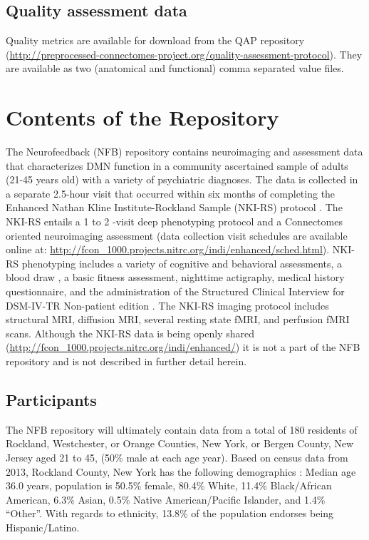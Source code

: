 \subsection{Quality assessment data}
Quality metrics are available for download from the QAP repository (\url{http://preprocessed-connectomes-project.org/quality-assessment-protocol}). They are available as two (anatomical and functional) comma separated value files.

\section{Contents of the Repository}
The Neurofeedback (NFB) repository contains neuroimaging and assessment data that characterizes DMN function in a community ascertained sample of adults (21-45 years old) with a variety of psychiatric diagnoses. The data is collected in a separate 2.5-hour visit that occurred within six months of completing the Enhanced Nathan Kline Institute-Rockland Sample (NKI-RS) protocol \cite{Nooner2012}. The NKI-RS entails a 1 to 2 -visit deep phenotyping protocol \cite{Nooner2012} and a Connectomes oriented neuroimaging assessment (data collection visit schedules are available online at: \url{http://fcon\_1000.projects.nitrc.org/indi/enhanced/sched.html}). NKI-RS phenotyping includes a variety of cognitive and behavioral assessments, a blood draw , a basic fitness assessment, nighttime actigraphy, medical history questionnaire, and the administration of the Structured Clinical Interview for DSM-IV-TR Non-patient edition \cite{First2002}. The NKI-RS imaging protocol includes structural MRI, diffusion MRI, several resting state fMRI, and perfusion fMRI scans. Although the NKI-RS data is being openly shared (\url{http://fcon\_1000.projects.nitrc.org/indi/enhanced/}) it is not a part of the NFB repository and is not described in further detail herein. 

\subsection{Participants}
The NFB repository will ultimately contain data from a total of 180 residents of Rockland, Westchester, or Orange Counties, New York, or Bergen County, New Jersey aged 21 to 45, (50\% male at each age year). Based on census data from 2013, Rockland County, New York has the following demographics \cite{Census2016}: Median age 36.0 years, population is 50.5\% female, 80.4\% White, 11.4\% Black/African American, 6.3\% Asian, 0.5\% Native American/Pacific Islander, and 1.4\% “Other”. With regards to ethnicity, 13.8\% of the population endorses being Hispanic/Latino.


